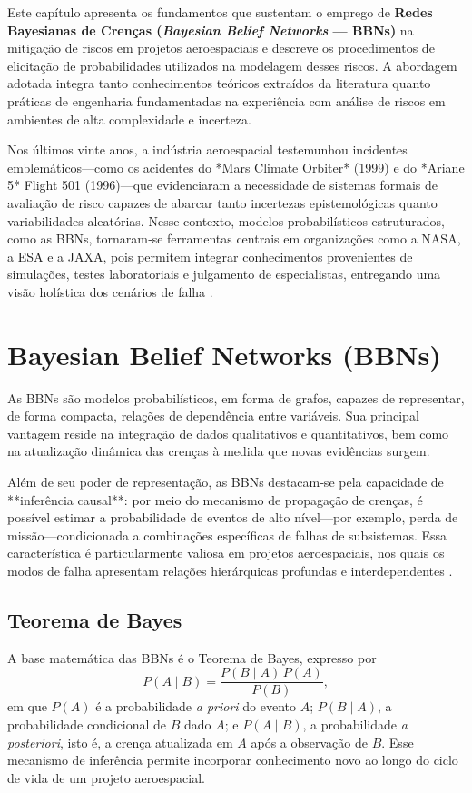 Este capítulo apresenta os fundamentos que sustentam o emprego de \textbf{Redes Bayesianas de Crenças (\emph{Bayesian Belief Networks} — BBNs)} na mitigação de riscos em projetos aeroespaciais e descreve os procedimentos de elicitação de probabilidades utilizados na modelagem desses riscos. A abordagem adotada integra tanto conhecimentos teóricos extraídos da literatura quanto práticas de engenharia fundamentadas na experiência com análise de riscos em ambientes de alta complexidade e incerteza.


Nos últimos vinte anos, a indústria aeroespacial testemunhou incidentes emblemáticos—como os acidentes do *Mars Climate Orbiter* (1999) e do *Ariane 5* Flight 501 (1996)—que evidenciaram a necessidade de sistemas formais de avaliação de risco capazes de abarcar tanto incertezas epistemológicas quanto variabilidades aleatórias. Nesse contexto, modelos probabilísticos estruturados, como as BBNs, tornaram‑se ferramentas centrais em organizações como a NASA, a ESA e a JAXA, pois permitem integrar conhecimentos provenientes de simulações, testes laboratoriais e julgamento de especialistas, entregando uma visão holística dos cenários de falha \cite{banerjee2020risk, nasa2022safety}.




\section{Bayesian Belief Networks (BBNs)}
\label{sec:bbn}
As BBNs são modelos probabilísticos, em forma de grafos, capazes de representar, de forma compacta, relações de dependência entre variáveis. Sua principal vantagem reside na integração de dados qualitativos e quantitativos, bem como na atualização dinâmica das crenças à medida que novas evidências surgem.


Além de seu poder de representação, as BBNs destacam‑se pela capacidade de **inferência causal**: por meio do mecanismo de propagação de crenças, é possível estimar a probabilidade de eventos de alto nível—por exemplo, perda de missão—condicionada a combinações específicas de falhas de subsistemas. Essa característica é particularmente valiosa em projetos aeroespaciais, nos quais os modos de falha apresentam relações hierárquicas profundas e interdependentes \cite{pearl1988probabilistic}.

\subsection{Teorema de Bayes}
\label{subsec:bayes}
A base matemática das BBNs é o Teorema de Bayes, expresso por
\begin{equation}
  P(A\mid B) = \frac{P(B\mid A)\,P(A)}{P(B)},
  \label{eq:bayes}
\end{equation}
em que $P(A)$ é a probabilidade \emph{a priori} do evento $A$; $P(B\mid A)$, a probabilidade condicional de $B$ dado $A$; e $P(A\mid B)$, a probabilidade \emph{a posteriori}, isto é, a crença atualizada em $A$ após a observação de $B$. Esse mecanismo de inferência permite incorporar conhecimento novo ao longo do ciclo de vida de um projeto aeroespacial.

